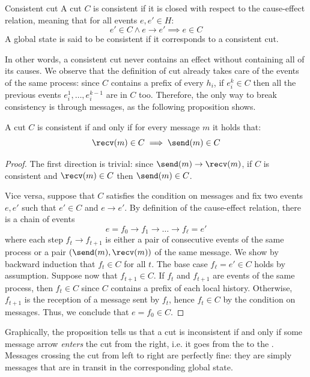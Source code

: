 \begin{frameddefn}[label={def:consistent-cut}]{Consistent cut}
  A cut $C$ is consistent if it is closed with respect to the cause-effect relation, meaning that for all events $e, e' \in H$:
  \[e' \in C \land e \to e' \implies e \in C\]
  A global state is said to be consistent if it corresponds to a consistent cut.
\end{frameddefn}

In other words, a consistent cut never contains an effect without containing all of its causes. We observe that the definition of cut already takes care of the events of the same process: since $C$ contains a prefix of every $h_i$, if $e_i^k \in C$ then all the previous events $e_i^1, \ldots, e_i^{k-1}$ are in $C$ too. Therefore, the only way to break consistency is through messages, as the following proposition shows.

\begin{framedprop}[label={prop:cut-messages}]{}
  A cut $C$ is consistent if and only if for every message $m$ it holds that:
  \[\recv(m) \in C \implies \send(m) \in C\]
\end{framedprop}

\begin{proof}
  The first direction is trivial: since $\send(m) \to \recv(m)$, if $C$ is consistent and $\recv(m) \in C$ then $\send(m) \in C$.

  Vice versa, suppose that $C$ satisfies the condition on messages and fix two events $e,e'$ such that $e' \in C$ and $e \to e'$. By definition of the cause-effect relation, there is a chain of events
  \[e = f_0 \to f_1 \to \ldots \to f_\ell = e'\]
  where each step $f_{t} \to f_{t+1}$ is either a pair of consecutive events of the same process or a pair $(\send(m), \recv(m))$ of the same message. We show by backward induction that $f_t \in C$ for all $t$. The base case $f_\ell = e' \in C$ holds by assumption. Suppose now that $f_{t+1} \in C$. If $f_t$ and $f_{t+1}$ are events of the same process, then $f_t \in C$ since $C$ contains a prefix of each local history. Otherwise, $f_{t+1}$ is the reception of a message sent by $f_t$, hence $f_t \in C$ by the condition on messages. Thus, we conclude that $e = f_0 \in C$.
\end{proof}

Graphically, the proposition tells us that a cut is inconsistent if and only if some message arrow \textit{enters} the cut from the right, i.e. it goes from the  to the . Messages crossing the cut from left to right are perfectly fine: they are simply messages that are in transit in the corresponding global state.

